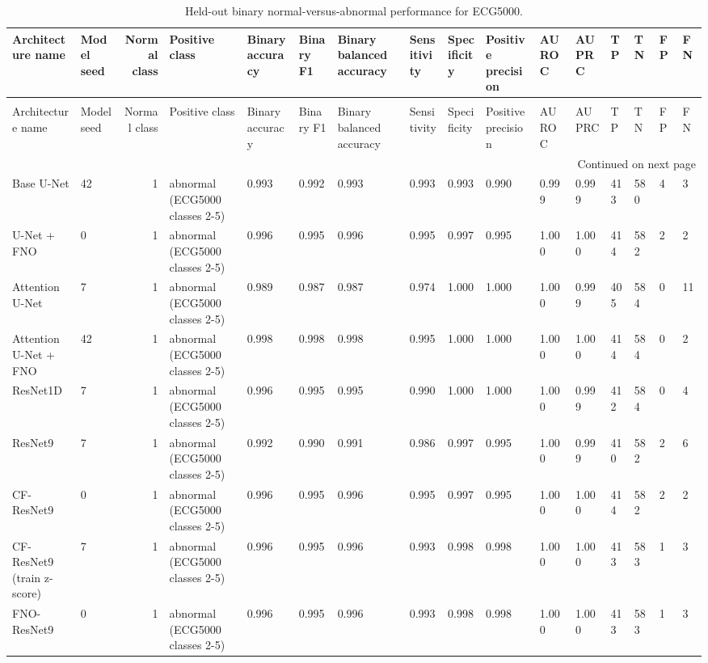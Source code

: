 \begin{longtable}{llrlllllllllllll}
\caption{Held-out binary normal-versus-abnormal performance for ECG5000.} \label{tab:ecg5000_binary_normal_abnormal} \\
\toprule
Architecture name & Model seed & Normal class & Positive class & Binary accuracy & Binary F1 & Binary balanced accuracy & Sensitivity & Specificity & Positive precision & AUROC & AUPRC & TP & TN & FP & FN \\
\midrule
\endfirsthead
\caption[]{Held-out binary normal-versus-abnormal performance for ECG5000.} \\
\toprule
Architecture name & Model seed & Normal class & Positive class & Binary accuracy & Binary F1 & Binary balanced accuracy & Sensitivity & Specificity & Positive precision & AUROC & AUPRC & TP & TN & FP & FN \\
\midrule
\endhead
\midrule
\multicolumn{16}{r}{Continued on next page} \\
\midrule
\endfoot
\bottomrule
\endlastfoot
Base U-Net & 42 & 1 & abnormal (ECG5000 classes 2-5) & 0.993 & 0.992 & 0.993 & 0.993 & 0.993 & 0.990 & 0.999 & 0.999 & 413 & 580 & 4 & 3 \\
U-Net + FNO & 0 & 1 & abnormal (ECG5000 classes 2-5) & 0.996 & 0.995 & 0.996 & 0.995 & 0.997 & 0.995 & 1.000 & 1.000 & 414 & 582 & 2 & 2 \\
Attention U-Net & 7 & 1 & abnormal (ECG5000 classes 2-5) & 0.989 & 0.987 & 0.987 & 0.974 & 1.000 & 1.000 & 1.000 & 0.999 & 405 & 584 & 0 & 11 \\
Attention U-Net + FNO & 42 & 1 & abnormal (ECG5000 classes 2-5) & 0.998 & 0.998 & 0.998 & 0.995 & 1.000 & 1.000 & 1.000 & 1.000 & 414 & 584 & 0 & 2 \\
ResNet1D & 7 & 1 & abnormal (ECG5000 classes 2-5) & 0.996 & 0.995 & 0.995 & 0.990 & 1.000 & 1.000 & 1.000 & 0.999 & 412 & 584 & 0 & 4 \\
ResNet9 & 7 & 1 & abnormal (ECG5000 classes 2-5) & 0.992 & 0.990 & 0.991 & 0.986 & 0.997 & 0.995 & 1.000 & 0.999 & 410 & 582 & 2 & 6 \\
CF-ResNet9 & 0 & 1 & abnormal (ECG5000 classes 2-5) & 0.996 & 0.995 & 0.996 & 0.995 & 0.997 & 0.995 & 1.000 & 1.000 & 414 & 582 & 2 & 2 \\
CF-ResNet9 (train z-score) & 7 & 1 & abnormal (ECG5000 classes 2-5) & 0.996 & 0.995 & 0.996 & 0.993 & 0.998 & 0.998 & 1.000 & 1.000 & 413 & 583 & 1 & 3 \\
FNO-ResNet9 & 0 & 1 & abnormal (ECG5000 classes 2-5) & 0.996 & 0.995 & 0.996 & 0.993 & 0.998 & 0.998 & 1.000 & 1.000 & 413 & 583 & 1 & 3 \\

\end{longtable}
